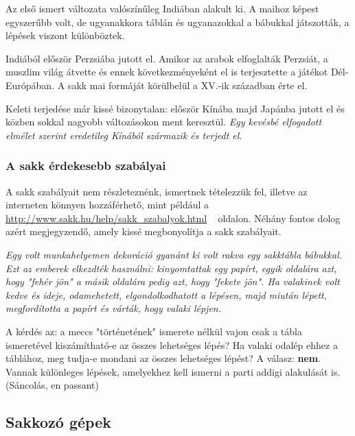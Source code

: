 \documentclass[twoside, a4paper, 12pt]{article}
\begin{document}
Az első ismert változata valószínűleg Indiában alakult ki. A maihoz képest egyszerűbb volt, de ugyanakkora táblán és ugyanazokkal a bábukkal játszották, a lépések viszont különböztek. 

Indiából először Perzsiába jutott el. Amikor az arabok elfoglalták Perzsiát, a muszlim világ átvette és ennek következményeként el is terjesztette a játékot Dél-Európában. A sakk mai formáját körülbelül a XV.-ik században érte el.

Keleti terjedése már kissé bizonytalan: először Kínába majd Japánba jutott el és közben sokkal nagyobb változásokon ment keresztül.
\textit{Egy kevésbé elfogadott elmélet szerint eredetileg Kínából származik és terjedt el.}\cite{HistoryOfChessHu}\cite{HistoryOfChessEn}

\subsubsection{A sakk érdekesebb szabályai}
A sakk szabályait nem részleteznénk, ismertnek tételezzük fel, illetve az interneten könnyen hozzáférhető, mint például a \url{http://www.sakk.hu/help/sakk_szabalyok.html} ~\cite{chessrulessakkhu} oldalon. Néhány fontos dolog azért megjegyzendő, amely kissé megbonyolítja a sakk szabályait.

\textit{Egy volt munkahelyemen dekoráció gyanánt ki volt rakva egy sakktábla bábukkal. Ezt az emberek elkezdték használni: kinyomtattak egy papírt, egyik oldalára azt, hogy "fehér jön" a másik oldalára pedig azt, hogy "fekete jön". Ha valakinek volt kedve és ideje, odamehetett, elgondolkodhatott a lépésen, majd miután lépett, megfordította a papírt és várták, hogy valaki lépjen.}

A kérdés az: a meccs "történetének" ismerete nélkül vajon csak a tábla ismeretével kiszámítható-e az összes lehetséges lépés? Ha valaki odalép ehhez a táblához, meg tudja-e mondani az összes lehetséges lépést? A válasz: \textbf{nem}. Vannak különleges lépések, amelyekhez kell ismerni a parti addigi alakulását is. (Sáncolás, en passant)

\subsection{Sakkozó gépek}
\end{document}
